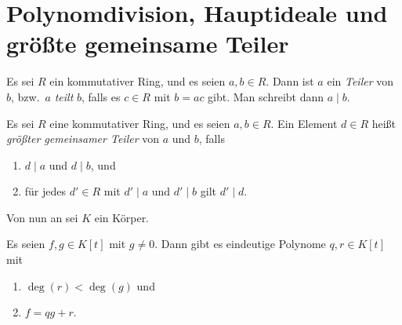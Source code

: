 \section{Polynomdivision, Hauptideale und größte gemeinsame Teiler}


\begin{definition}
  Es sei $R$ ein kommutativer Ring, und es seien $a, b \in R$.
  Dann ist $a$ ein \emph{Teiler} von $b$, bzw.\ $a$ \emph{teilt} $b$, falls es $c \in R$ mit $b = ac$ gibt.
  Man schreibt dann $a \mid b$.
\end{definition}


\begin{definition}
  Es sei $R$ eine kommutativer Ring, und es seien $a, b \in R$.
  Ein Element $d \in R$ heißt \emph{größter gemeinsamer Teiler} von $a$ und $b$, falls
  \begin{enumerate}
    \item
      $d \mid a$ und $d \mid b$, und
    \item
      für jedes $d' \in R$ mit $d' \mid a$ und $d' \mid b$ gilt $d' \mid d$.
  \end{enumerate}
\end{definition}


Von nun an sei $K$ ein Körper.


\begin{theorem}
  \label{theorem: polynomial division}
  Es seien $f, g \in K[t]$ mit $g \neq 0$.
  Dann gibt es eindeutige Polynome $q, r \in K[t]$ mit
  \begin{enumerate}
    \item
      $\deg(r) < \deg(g)$ und
    \item
      $f = qg + r$.
  \end{enumerate}
\end{theorem}


